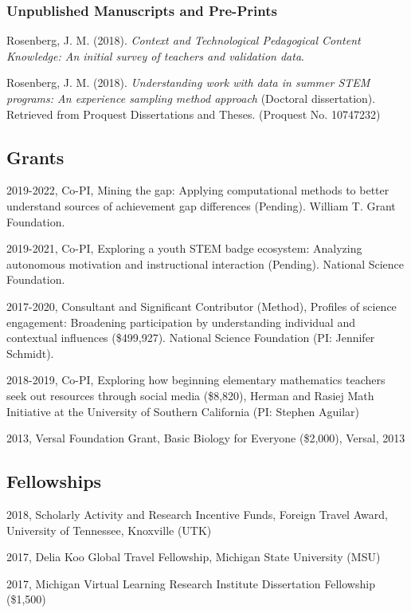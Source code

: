 \documentclass[]{article}
\begin{document}
\subsubsection{Unpublished Manuscripts and
Pre-Prints}\label{unpublished-manuscripts-and-pre-prints}

Rosenberg, J. M. (2018). \emph{Context and Technological Pedagogical
Content Knowledge: An initial survey of teachers and validation data}.

Rosenberg, J. M. (2018). \emph{Understanding work with data in summer
STEM programs: An experience sampling method approach} (Doctoral
dissertation). Retrieved from Proquest Dissertations and Theses.
(Proquest No. 10747232)

\subsection{Grants}\label{grants}

2019-2022, Co-PI, Mining the gap: Applying computational methods to
better understand sources of achievement gap differences (Pending).
William T. Grant Foundation.

2019-2021, Co-PI, Exploring a youth STEM badge ecosystem: Analyzing
autonomous motivation and instructional interaction (Pending). National
Science Foundation.

2017-2020, Consultant and Significant Contributor (Method), Profiles of
science engagement: Broadening participation by understanding individual
and contextual influences (\$499,927). National Science Foundation (PI:
Jennifer Schmidt).

2018-2019, Co-PI, Exploring how beginning elementary mathematics
teachers seek out resources through social media (\$8,820), Herman and
Rasiej Math Initiative at the University of Southern California (PI:
Stephen Aguilar)

2013, Versal Foundation Grant, Basic Biology for Everyone (\$2,000),
Versal, 2013

\subsection{Fellowships}\label{fellowships}

2018, Scholarly Activity and Research Incentive Funds, Foreign Travel
Award, University of Tennessee, Knoxville (UTK)

2017, Delia Koo Global Travel Fellowship, Michigan State University
(MSU)

2017, Michigan Virtual Learning Research Institute Dissertation
Fellowship (\$1,500)
\end{document}
